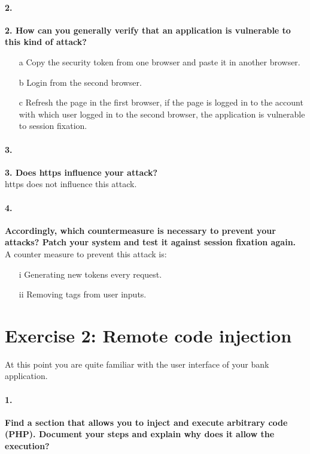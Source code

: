 \documentclass[12pt]{report}
\begin{document}
	\paragraph*{2.}{\bf 2. How can you generally verify that an application is vulnerable to this kind of attack?}\\
	
	\begin{itemize}
			
		\item[a] Copy the security token from one browser and paste it in another browser.
		\item[b] Login from the second browser.
		\item[c] Refresh the page in the first browser, if the page is logged in to the account with which user logged in to the second browser, the application is vulnerable to session fixation.
	\end{itemize}

	\paragraph*{3.}{\bf 3. Does https influence your attack?}\\
	
	https does not influence this attack.
	
	\paragraph*{4.}{\bf Accordingly, which countermeasure is necessary to prevent your attacks? Patch your system and test it against session fixation again.}\\
	
	A counter measure to prevent this attack is:
	
	\begin{itemize}
		\item[i] Generating new tokens every request.
		\item[ii] Removing tags from user inputs.
	\end{itemize}
		
		
	\section*{Exercise 2: Remote code injection}
	
	At this point you are quite familiar with the user interface of your bank application.
	
	\paragraph*{1.}{\bf Find a section that allows you to inject and execute arbitrary code (PHP). Document your steps and explain why does it allow the execution?}\\
	
\end{document}
